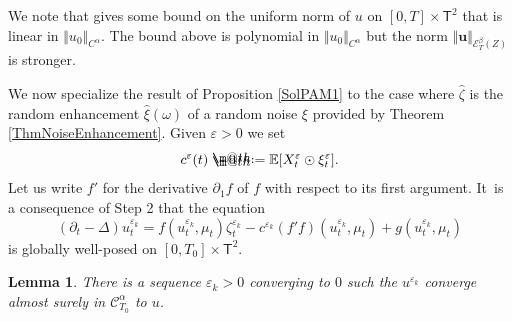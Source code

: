 \documentclass[JEP,XML,SOM,Unicode,published]{cedram}
\makeatletter
\newtheorem{lem}[thm]{Lemma}
\theoremstyle{definition}
\let\epsilon\varepsilon
\newcommand\bbE{\mathbb{E}}
\newcommand{\mcE}{\mathcal{E}}
\newcommand{\bsu}{\boldsymbol{u}}
\newcommand{\scrC}{\ensuremath{\mathscr{C}}}
\newcommand*{\defeq}{\mathrel{\rlap{%
\raisebox{0.3ex}{$\m@th\cdot$}}%
\raisebox{-0.3ex}{$\m@th\cdot$}}%
=}
\makeatother
\begin{document}
We note that \cite{CFW} gives some bound on the uniform norm of $u$ on $[0,T]\times \mathsf{T}^2$ that is linear in $\Vert u_0\Vert_{C^\alpha}$. The bound above is polynomial in $\Vert u_0\Vert_{C^\alpha}$ but the norm $\Vert \bsu\Vert_{\mcE_T^\beta(Z)}$ is stronger.

We now specialize the result of Proposition \ref{SolPAM1} to the case where $\widehat\zeta$ is the random enhancement $\widehat\xi(\omega)$ of a random noise $\xi$ provided by Theorem \ref{ThmNoiseEnhancement}. Given $\epsilon>0$ we set
\[
c^\epsilon(t) \defeq \bbE[X^{\epsilon}_t \odot \xi^{\epsilon}_t].
\]
Let us write $f'$ for the derivative $\partial_1f$ of $f$ with respect to its first argument. It~is a consequence of Step 2 that the equation
\begin{equation} \label{EqRenormalizedEqMuFixed}
(\partial_t - \Delta) u^{\epsilon_k}_t = f(u^{\epsilon_k}_t,\mu_t)\zeta^{\epsilon_k}_t - c^{\epsilon_k} (f'f)(u^{\epsilon_k}_t, \mu_t) + g(u^{\epsilon_k}_t,\mu_t)
\end{equation}
is globally well-posed on $[0,T_0]\times \mathsf{T}^2$.

\begin{lem} \label{LemASconvergenceSubsequence}
There is a sequence $\epsilon_k>0$ converging to $0$ such the $u^{\epsilon_k}$ converge almost surely in $\scrC^\alpha_{T_0}$ to $u$.
\end{lem}
\end{document}
